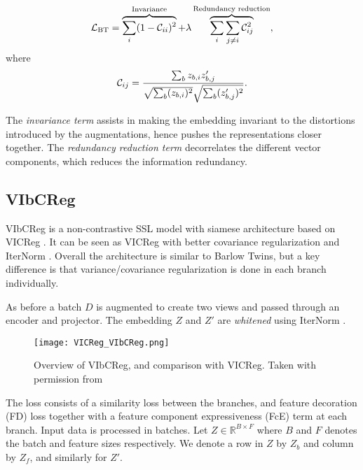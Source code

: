 \documentclass[../../thesis.tex]{subfiles}
\begin{document}
\begin{equation}
    \mathcal{L}_{\text{BT}} = 
    \overbrace{\sum_i (1 - \mathcal{C}_{ii})^2}^{\text{Invariance}}
    +\lambda  \overbrace{\sum_i\sum_{j\neq i} \mathcal{C}_{ij}^2}^{\text{Redundancy reduction}},
\end{equation}
where
\begin{equation}
    \mathcal{C}_{ij} = \frac{\sum_b z_{b,i}z_{b,j}'}{\sqrt{\sum_b (z_{b,i})^2}\sqrt{\sum_b (z_{b,j}')^2}}.
\end{equation}

The \textit{invariance term} assists in making the embedding invariant to the distortions introduced by the augmentations, hence pushes the representations closer together. The \textit{redundancy reduction term} decorrelates the different vector components, which reduces the information redundancy. \newline



\subsection{VIbCReg}

VIbCReg \cite{lee2024vibcreg} is a non-contrastive SSL model with siamese architecture based on VICReg \cite{bardes2022vicreg}. It can be seen as VICReg with better covariance regularization and IterNorm \cite{huang2019iterative}. Overall the architecture is similar to Barlow Twins, but a key difference is that variance/covariance regularization is done in each branch individually.\newline

As before a batch $D$ is augmented to create two views and passed through an encoder and projector. The embedding $Z$ and $Z'$ are \textit{whitened}  using IterNorm \cite{huang2019iterative}.\newline

\begin{figure}[h]
    \texttt{[image: VICReg\_VIbCReg.png]}
    \centering    
    \caption{Overview of VIbCReg, and comparison with VICReg. Taken with permission from \cite{lee2024computer}}
\end{figure}

The loss consists of a similarity loss between the branches, and feature decoration (FD) loss together with a feature component expressiveness (FcE) term at each branch. Input data is processed in batches. Let $Z \in \mathbb{R}^{B\times F}$ where $B$ and $F$ denotes the batch and feature sizes respectively. We denote a row in $Z$ by $Z_b$ and column by $Z_f$, and similarly for $Z'$. \newline
\end{document}
